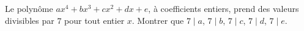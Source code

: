 Le polynôme $ax^4 + bx^3 + cx^2 + dx + e$, à coefficients entiers, prend des valeurs divisibles par $7$ pour tout entier $x$. Montrer que $7 \mid a$, $7 \mid b$, $7 \mid c$, $7 \mid d$, $7 \mid e$.
